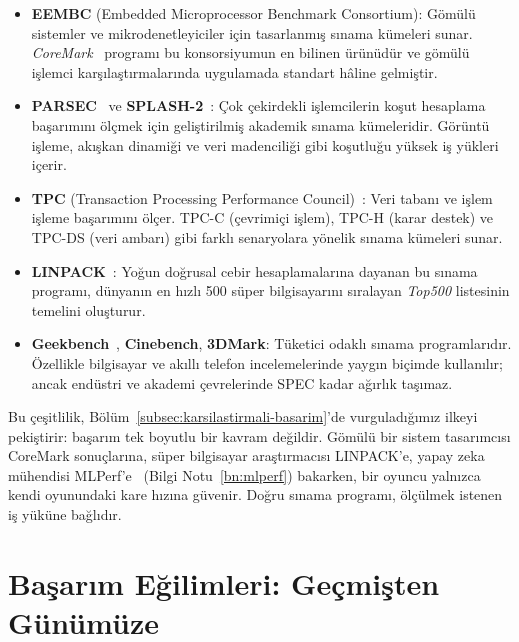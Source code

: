 \begin{itemize}
    \item \textbf{EEMBC} (Embedded Microprocessor Benchmark Consortium): Gömülü sistemler ve mikrodenetleyiciler için tasarlanmış sınama kümeleri sunar. \emph{CoreMark}~\cite{galon2012} programı bu konsorsiyumun en bilinen ürünüdür ve gömülü işlemci karşılaştırmalarında uygulamada standart hâline gelmiştir.
    \item \textbf{PARSEC}~\cite{bienia2008} ve \textbf{SPLASH-2}~\cite{woo1995}: Çok çekirdekli işlemcilerin koşut hesaplama başarımını ölçmek için geliştirilmiş akademik sınama kümeleridir. Görüntü işleme, akışkan dinamiği ve veri madenciliği gibi koşutluğu yüksek iş yükleri içerir.
    \item \textbf{TPC} (Transaction Processing Performance Council)~\cite{tpc}: Veri tabanı ve işlem işleme başarımını ölçer. TPC-C (çevrimiçi işlem), TPC-H (karar destek) ve TPC-DS (veri ambarı) gibi farklı senaryolara yönelik sınama kümeleri sunar.
    \item \textbf{LINPACK}~\cite{dongarra2003}: Yoğun doğrusal cebir hesaplamalarına dayanan bu sınama programı, dünyanın en hızlı 500 süper bilgisayarını sıralayan \emph{Top500} listesinin temelini oluşturur.
    \item \textbf{Geekbench}~\cite{geekbench}, \textbf{Cinebench}, \textbf{3DMark}: Tüketici odaklı sınama programlarıdır. Özellikle bilgisayar ve akıllı telefon incelemelerinde yaygın biçimde kullanılır; ancak endüstri ve akademi çevrelerinde SPEC kadar ağırlık taşımaz.
\end{itemize}

Bu çeşitlilik, Bölüm~\ref{subsec:karsilastirmali-basarim}'de vurguladığımız ilkeyi pekiştirir: başarım tek boyutlu bir kavram değildir. Gömülü bir sistem tasarımcısı CoreMark sonuçlarına, süper bilgisayar araştırmacısı LINPACK'e, yapay zeka mühendisi MLPerf'e~\cite{mattson2020} (Bilgi Notu~\ref{bn:mlperf}) bakarken, bir oyuncu yalnızca kendi oyunundaki kare hızına güvenir. Doğru sınama programı, ölçülmek istenen iş yüküne bağlıdır.

\section{Başarım Eğilimleri: Geçmişten Günümüze}
\label{sec:basarim-egilimleri}

